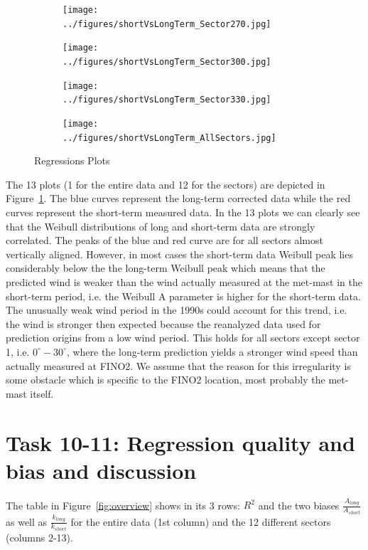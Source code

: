 \documentclass[10pt]{article}
\begin{document}
\begin{figure}[H]
\begin{subfigure}{0.3\textwidth}
\end{subfigure}
\begin{subfigure}{0.3\textwidth}
  \centering
  \texttt{[image: ../figures/shortVsLongTerm\_Sector270.jpg]}
\end{subfigure}
\begin{subfigure}{0.3\textwidth}
  \centering
  \texttt{[image: ../figures/shortVsLongTerm\_Sector300.jpg]}
\end{subfigure}
\begin{subfigure}{0.3\textwidth}
  \centering
  \texttt{[image: ../figures/shortVsLongTerm\_Sector330.jpg]}
\end{subfigure}
\begin{subfigure}{0.3\textwidth}
  \centering
  \texttt{[image: ../figures/shortVsLongTerm\_AllSectors.jpg]}
\end{subfigure}
  \caption{Regressions Plots}
\label{fig:CompWeibull}
\end{figure}


The 13 plots (1 for the entire data and 12 for the sectors) are depicted in Figure~\ref{fig:CompWeibull}. The blue curves represent the long-term corrected data while the red curves represent the short-term measured data. In the 13 plots we can clearly see that the Weibull distributions of long and short-term data are strongly correlated. The peaks of the blue and red curve are for all sectors almost vertically aligned. However, in most cases the short-term data Weibull peak lies considerably below the the long-term Weibull peak which means that the predicted wind is weaker than the wind actually measured at the met-mast in the short-term period, i.e. the Weibull A parameter is higher for the short-term data. The unusually weak wind period in the 1990s could account for this trend, i.e. the wind is stronger then expected because the reanalyzed data used for prediction origins from a low wind period. This holds for all sectors except sector 1, i.e. $0^{\circ}-30^{\circ}$, where the long-term prediction yields a stronger wind speed than actually measured at FINO2. We assume that the reason for this irregularity is some obstacle which is specific to the FINO2 location, most probably the met-mast itself.

\section{Task 10-11: Regression quality and bias and discussion}
The table in Figure~\ref{fig:overview} shows in its 3 rows: $R^2$ and the two biases $\frac{A_{long}}{A_{short}}$ as well as $\frac{k_{long}}{k_{short}}$ for the entire data (1st column) and the 12 different sectors (columns 2-13). 
\end{document}
